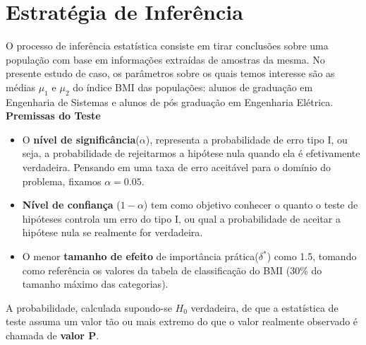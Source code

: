\documentclass[12pt, a4paper]{article}
\begin{document}
\section{Estratégia de Inferência}
\label{sec:estrategia-inferencia}
O processo de inferência estatística consiste em tirar conclusões sobre uma população com base em informações extraídas de amostras da mesma. No presente estudo de caso, os parâmetros sobre os quais temos interesse são as médias $\mu_{1}$ e $\mu_{2}$ do índice BMI das populações: alunos de graduação em Engenharia de Sistemas e alunos de pós graduação em Engenharia Elétrica.
\newline
\newline
\textbf{Premissas do Teste}
\begin{itemize}
\item O \textbf{nível de significância}($\alpha$), representa a probabilidade de erro tipo I, ou seja, a probabilidade de rejeitarmos a hipótese nula quando ela é efetivamente verdadeira. Pensando em uma taxa de erro aceitável para o domínio do problema, fixamos $\alpha = 0.05$.
\item \textbf{Nível de confiança} ($1 - \alpha$) tem como objetivo conhecer o quanto o teste de hipóteses controla um erro do tipo I, ou qual a probabilidade de aceitar a hipótese nula se realmente for verdadeira.
\item O menor \textbf{tamanho de efeito} de importância prática($\delta^*$) como 1.5, tomando como referência os valores da tabela de classificação do BMI (30\% do tamanho máximo das categorias).
\end{itemize}
\par A probabilidade, calculada supondo-se $H_{0}$ verdadeira, de que a estatística de teste assuma um valor tão ou mais extremo do que o valor realmente observado é chamada de \textbf{valor P}.
\end{document}
